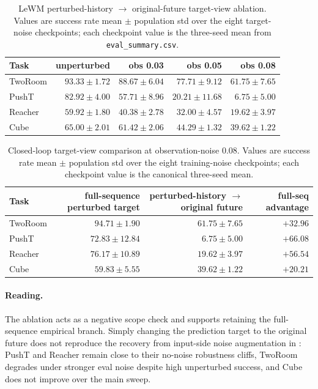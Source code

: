 \documentclass[10pt]{article}
\newcommand{\code}[1]{\texttt{\small #1}}
\begin{document}
\begin{table}[H]
\centering
\caption{LeWM perturbed-history $\to$ original-future target-view ablation. Values are success rate mean $\pm$ population std over the eight target-noise checkpoints; each checkpoint value is the three-seed mean from \code{eval\_summary.csv}.}
\label{tab:target-view-origin}
\small
\begin{tabular}{lrrrr}
\toprule
Task & unperturbed & obs 0.03 & obs 0.05 & obs 0.08 \\
\midrule
TwoRoom & $93.33 \pm 1.72$ & $88.67 \pm 6.04$ & $77.71 \pm 9.12$ & $61.75 \pm 7.65$ \\
PushT   & $82.92 \pm 4.00$ & $57.71 \pm 8.96$ & $20.21 \pm 11.68$ & $\phantom{0}6.75 \pm 5.00$ \\
Reacher & $59.92 \pm 1.80$ & $40.38 \pm 2.78$ & $32.00 \pm 4.57$ & $19.62 \pm 3.97$ \\
Cube    & $65.00 \pm 2.01$ & $61.42 \pm 2.06$ & $44.29 \pm 1.32$ & $39.62 \pm 1.22$ \\
\bottomrule
\end{tabular}
\end{table}

\begin{table}[H]
\centering
\caption{Closed-loop target-view comparison at observation-noise 0.08. Values are success rate mean $\pm$ population std over the eight training-noise checkpoints; each checkpoint value is the canonical three-seed mean.}
\label{tab:target-view-closed-loop}
\small
\begin{tabular}{lrrr}
\toprule
Task & full-sequence perturbed target & perturbed-history $\to$ original future & full-seq advantage \\
\midrule
TwoRoom & $94.71 \pm 1.90$ & $61.75 \pm 7.65$ & $+32.96$ \\
PushT   & $72.83 \pm 12.84$ & $\phantom{0}6.75 \pm 5.00$ & $+66.08$ \\
Reacher & $76.17 \pm 10.89$ & $19.62 \pm 3.97$ & $+56.54$ \\
Cube    & $59.83 \pm 5.55$ & $39.62 \pm 1.22$ & $+20.21$ \\
\bottomrule
\end{tabular}
\end{table}

\paragraph{Reading.} The ablation acts as a negative scope check and supports retaining the full-sequence empirical branch. Simply changing the prediction target to the original future does not reproduce the recovery from input-side noise augmentation in : PushT and Reacher remain close to their no-noise robustness cliffs, TwoRoom degrades under stronger eval noise despite high unperturbed success, and Cube does not improve over the main sweep.
\end{document}
